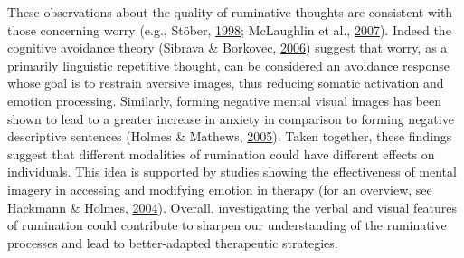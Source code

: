 \documentclass[a4paper,12pt,twoside,onecolumn,openright,final,oldfontcommands]{memoir}
\begin{document}
These observations about the quality of ruminative thoughts are consistent with those concerning worry (e.g., Stöber, \protect\hyperlink{ref-stober_worry_1998}{1998}; McLaughlin et al., \protect\hyperlink{ref-mclaughlin_effects_2007}{2007}). Indeed the cognitive avoidance theory (Sibrava \& Borkovec, \protect\hyperlink{ref-davey_cognitive_2006}{2006}) suggest that worry, as a primarily linguistic repetitive thought, can be considered an avoidance response whose goal is to restrain aversive images, thus reducing somatic activation and emotion processing. Similarly, forming negative mental visual images has been shown to lead to a greater increase in anxiety in comparison to forming negative descriptive sentences (Holmes \& Mathews, \protect\hyperlink{ref-holmes_mental_2005}{2005}). Taken together, these findings suggest that different modalities of rumination could have different effects on individuals. This idea is supported by studies showing the effectiveness of mental imagery in accessing and modifying emotion in therapy (for an overview, see Hackmann \& Holmes, \protect\hyperlink{ref-hackmann_reflecting_2004}{2004}). Overall, investigating the verbal and visual features of rumination could contribute to sharpen our understanding of the ruminative processes and lead to better-adapted therapeutic strategies.
\end{document}
